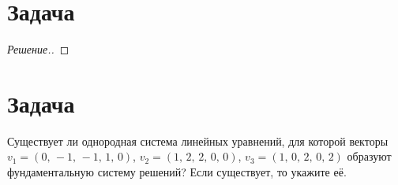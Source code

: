 \documentclass[a4paper]{article}
\theoremstyle{remark}
\begin{document}
    \section*{Задача }
	    \begin{proof}[Решение.]
		
      \end{proof}

    \section*{Задача }
      Существует ли однородная система линейных уравнений, для которой векторы $v_1 =(0,\, -1,\, -1,\, 1,\, 0)$, $v_2 = (1,\, 2,\, 2,\, 0,\, 0)$, $v_3 = (1,\, 0,\, 2,\, 0,\, 2)$ образуют фундаментальную систему решений? Если существует, то укажите её.
\end{document}
